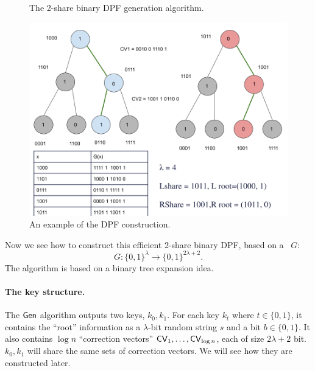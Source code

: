 \begin{figure}
\begin{minipage}{\textwidth}
\begin{mdframed}
        \end{mdframed}
    \end{minipage}
    \caption{The 2-share binary DPF generation algorithm.\label{fig:DPF}}
\end{figure}

\begin{figure}
    \centering
    \includegraphics[scale=0.4]{scribimg_dpftree.png}
    \caption{An example of the DPF construction.\label{fig:example-DPF}}
\end{figure}



Now we see how to construct this efficient 2-share binary DPF, based on a \Prg~$G$:
 $$G: \{0,1\}^{\lambda} \rightarrow  \{0,1\}^{2\lambda + 2}. $$
The algorithm is based on a binary tree expansion idea.
 
\paragraph{The key structure.} The ${\sf Gen}$ algorithm outputs two keys, $k_0, k_1$. For each key $k_t$ where $t\in\{0,1\}$, it contains the ``root'' information as a $\lambda$-bit random string $s$ and a bit $b\in\{0,1\}$. It also contains $\log n$ ``correction vectors'' ${\sf CV}_1, \dots, {\sf CV}_{\log n}$, each of size $2\lambda+2$ bit. $k_0, k_1$ will share the same sets of correction vectors. 
We will see how they are constructed later. 


